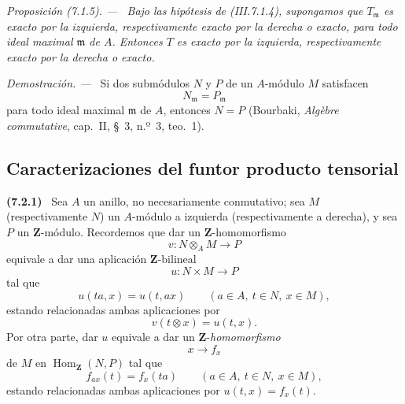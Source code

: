 \documentclass[10pt,oneside]{book}
\newcommand{\bb}[1]{\mathbf{#1}}
\newcommand{\Hom}{\operatorname{Hom}}
\newcommand{\sref}[2][]{\textup{(#2)}}
\newcommand{\oldpage}[2][]{\setcounter{footnote}{0}\marginpar{\scriptsize\textbf{#1}~|~#2}\ignorespaces}
\newenvironment{env}[1][]{\par\medskip\noindent\textbf{(#1)}\ }{\par}
\newenvironment{proposition}[1][]{\par\medskip\noindent\itshape Proposición (#1). ---\ }{\par}
\newenvironment{proof}{\par\medskip\noindent\textit{Demostración. ---\ }}{\par}
\begin{document}
\begin{proposition}[7.1.5]
\label{III.7.1.5}
Bajo las hipótesis de \sref{III.7.1.4}, supongamos que
$T_{\mathfrak m}$ es exacto por la izquierda, respectivamente
exacto por la derecha o exacto, para todo ideal maximal
$\mathfrak m$ de $A$. Entonces $T$ es exacto por la izquierda,
respectivamente exacto por la derecha o exacto.
\end{proposition}

\begin{proof}
Si dos submódulos $N$ y $P$ de un $A$-módulo $M$ satisfacen
\[
  N_{\mathfrak m}=P_{\mathfrak m}
\]
para todo ideal maximal $\mathfrak m$ de $A$, entonces $N=P$
(Bourbaki, \emph{Algèbre commutative}, cap.~II, \S~3,
n.º~3, teo.~1).
\end{proof}

\subsection{Caracterizaciones del funtor producto tensorial}
\label{subsection:III.7.2}

\begin{env}[7.2.1]
\label{III.7.2.1}
Sea $A$ un anillo, no necesariamente conmutativo; sea $M$
(respectivamente $N$) un $A$-módulo a izquierda
(respectivamente a derecha), y sea $P$ un $\bb Z$-módulo.
Recordemos que dar un $\bb Z$-homomorfismo
\[
  v:N\otimes_A M\longrightarrow P
\]
equivale a dar una aplicación $\bb Z$-bilineal
\[
  u:N\times M\longrightarrow P
\]
tal que
\[
  u(ta,x)=u(t,ax)
  \qquad(a\in A,\ t\in N,\ x\in M),
\]
estando relacionadas ambas aplicaciones por
\[
  v(t\otimes x)=u(t,x).
\]
Por otra parte, dar $u$ equivale a dar un
\oldpage[III]{177}
$\bb Z$-\emph{homomorfismo}
\[
  x\to f_x
\]
de $M$ en $\Hom_{\bb Z}(N,P)$ tal que
\[
  f_{ax}(t)=f_x(ta)
  \qquad(a\in A,\ t\in N,\ x\in M),
\]
estando relacionadas ambas aplicaciones por $u(t,x)=f_x(t)$.
\end{env}
\end{document}
